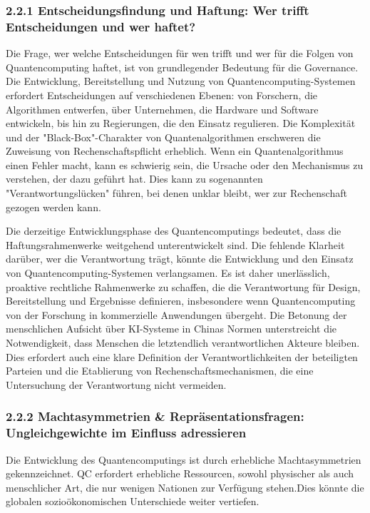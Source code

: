 \subsubsection{2.2.1 Entscheidungsfindung und Haftung: Wer trifft Entscheidungen und wer haftet?}
Die Frage, wer welche Entscheidungen für wen trifft und wer für die Folgen von Quantencomputing haftet, ist von grundlegender Bedeutung für die Governance. Die Entwicklung, Bereitstellung und Nutzung von Quantencomputing-Systemen erfordert Entscheidungen auf verschiedenen Ebenen: von Forschern, die Algorithmen entwerfen, über Unternehmen, die Hardware und Software entwickeln, bis hin zu Regierungen, die den Einsatz regulieren. Die Komplexität und der "Black-Box"-Charakter von Quantenalgorithmen erschweren die Zuweisung von Rechenschaftspflicht erheblich. Wenn ein Quantenalgorithmus einen Fehler macht, kann es schwierig sein, die Ursache oder den Mechanismus zu verstehen, der dazu geführt hat. Dies kann zu sogenannten "Verantwortungslücken" führen, bei denen unklar bleibt, wer zur Rechenschaft gezogen werden kann.

Die derzeitige Entwicklungsphase des Quantencomputings bedeutet, dass die Haftungsrahmenwerke weitgehend unterentwickelt sind. Die fehlende Klarheit darüber, wer die Verantwortung trägt, könnte die Entwicklung und den Einsatz von Quantencomputing-Systemen verlangsamen. Es ist daher unerlässlich, proaktive rechtliche Rahmenwerke zu schaffen, die die Verantwortung für Design, Bereitstellung und Ergebnisse definieren, insbesondere wenn Quantencomputing von der Forschung in kommerzielle Anwendungen übergeht. Die Betonung der menschlichen Aufsicht über KI-Systeme in Chinas Normen unterstreicht die Notwendigkeit, dass Menschen die letztendlich verantwortlichen Akteure bleiben. Dies erfordert auch eine klare Definition der Verantwortlichkeiten der beteiligten Parteien und die Etablierung von Rechenschaftsmechanismen, die eine Untersuchung der Verantwortung nicht vermeiden.

\subsubsection{2.2.2 Machtasymmetrien & Repräsentationsfragen: Ungleichgewichte im Einfluss adressieren}
Die Entwicklung des Quantencomputings ist durch erhebliche Machtasymmetrien gekennzeichnet. QC erfordert erhebliche Ressourcen, sowohl physischer als auch menschlicher Art, die nur wenigen Nationen zur Verfügung stehen.Dies könnte die globalen sozioökonomischen Unterschiede weiter vertiefen.

